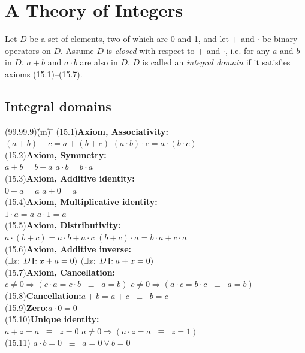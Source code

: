 \documentclass{amsart}
\newcommand{\lgap}{2pt}                             %
\newcommand{\equivss}{\ensuremath{\;\;\equiv\;\;}}  %
\newcommand{\impl}{\ensuremath{\Rightarrow}}        %
\newcommand{\thedr}{\rule[-.25ex]{.32mm}{1.75ex}}   %
\newcommand{\drrb}{\;\thedr\,{:}\;}                 %
\newcommand{\ext}{\exists}                          %
\begin{document}
\section*{A Theory of Integers}
Let $D$ be a set of elements, two of which are 0 and 1, and let $+$ and $\cdot$ be binary operators on $D$.
Assume $D$ is \emph{closed} with respect to $+$ and $\cdot$, i.e. for any $a$ and $b$ in $D$, $a+b$ and
$a \cdot b$ are also in $D$. $D$ is called an \emph{integral domain} if it satisfies axioms (15.1)--(15.7).

\subsection*{Integral domains}
\begin{tabbing}
(99.99.9)\;\=(m)\;\= \makebox[2in]{ } \= \kill
(15.1)\>\textbf{Axiom, Associativity:}\\[\lgap]
      \>   $(a + b) + c = a + (b + c)$
      \>\> $(a \cdot b) \cdot c = a \cdot (b \cdot c)$\\[\lgap]
(15.2)\>\textbf{Axiom, Symmetry:}\\[\lgap]
      \>   $a + b = b + a$
      \>\> $a \cdot b = b \cdot a$\\[\lgap]
(15.3)\>\textbf{Axiom, Additive identity:}\\[\lgap]
      \>   $0 + a = a$
      \>\> $a + 0 = a$\\[\lgap]
(15.4)\>\textbf{Axiom, Multiplicative identity:}\\[\lgap]
      \>   $1 \cdot a = a$
      \>\> $a \cdot 1 = a$\\[\lgap]
(15.5)\>\textbf{Axiom, Distributivity:}\\[\lgap]
      \>   $a \cdot (b + c) = a \cdot b + a \cdot c$
      \>\> $(b + c) \cdot a = b \cdot a + c \cdot a$\\[\lgap]
(15.6)\>\textbf{Axiom, Additive inverse:}\\[\lgap]
      \>   $(\ext x$: $D \drrb x + a = 0)$
      \>\> $(\ext x$: $D \drrb a + x = 0)$\\[\lgap]
(15.7)\>\textbf{Axiom, Cancellation:}\\[\lgap]
      \>   $c \ne 0 \impl (c \cdot a = c \cdot b \equivss a = b)$
      \>\> $c \ne 0 \impl (a \cdot c = b \cdot c \equivss a = b)$\\[\lgap]
(15.8)\>\textbf{Cancellation:}\quad $a + b = a + c \equivss b = c$\\[\lgap]
(15.9)\>\textbf{Zero:}\quad $a \cdot 0 = 0$\\[\lgap]
(15.10)\>\textbf{Unique identity:}\\[\lgap]
      \>   $a + z = a \equivss z = 0$
      \>\> $a \ne 0 \impl (a \cdot z = a \equivss z = 1)$\\[\lgap]
(15.11)\>  $a \cdot b = 0 \equivss a = 0 \lor b = 0$\\[\lgap]
\end{tabbing}
\end{document}
